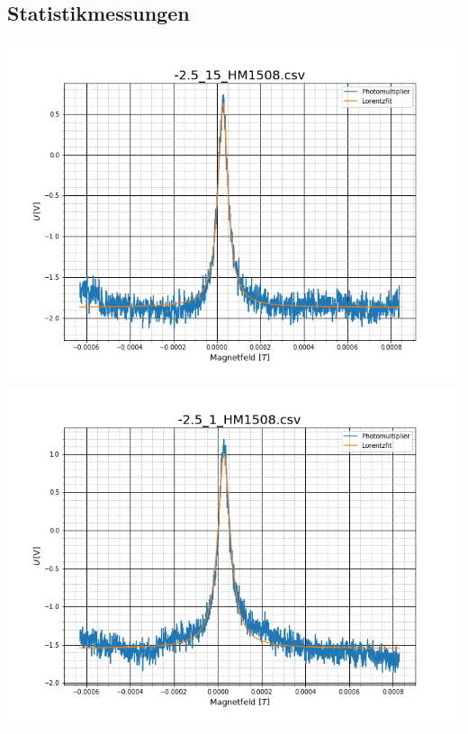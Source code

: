 \subsection{Statistikmessungen}
\begin{center}
\includegraphics[scale=0.3]{Bild/Anhang/Statistik/stat1}	\includegraphics[scale=0.3]{Bild/Anhang/Statistik/stat2}\\


\end{center}
